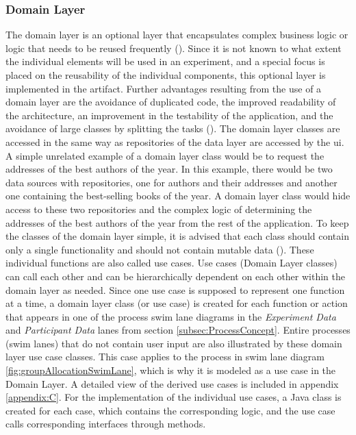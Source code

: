 \subsubsection{Domain Layer}

The domain layer is an optional layer that encapsulates complex business logic or logic that needs to be reused frequently (\cite{Google.2023}). Since it is not known to what extent the individual elements will be used in an experiment, and a special focus is placed on the reusability of the individual components, this optional layer is implemented in the artifact. Further advantages resulting from the use of a domain layer are the avoidance of duplicated code, the improved readability of the architecture, an improvement in the testability of the application, and the avoidance of large classes by splitting the tasks (\cite{Google.2023}). The domain layer classes are accessed in the same way as repositories of the data layer are accessed by the \ac{ui}. A simple unrelated example of a domain layer class would be to request the addresses of the best authors of the year. In this example, there would be two data sources with repositories, one for authors and their addresses and another one containing the best-selling books of the year. A domain layer class would hide access to these two repositories and the complex logic of determining the addresses of the best authors of the year from the rest of the application. To keep the classes of the domain layer simple, it is advised that each class should contain only a single functionality and should not contain mutable data (\cite{Google.2023}). These individual functions are also called use cases. Use cases (Domain Layer classes) can call each other and can be hierarchically dependent on each other within the domain layer as needed. Since one use case is supposed to represent one function at a time, a domain layer class (or use case) is created for each function or action that appears in one of the process swim lane diagrams in the \textit{Experiment Data} and \textit{Participant Data} lanes from section \ref{subsec:ProcessConcept}. Entire processes (swim lanes) that do not contain user input are also illustrated by these domain layer use case classes. This case applies to the process in swim lane diagram \ref{fig:groupAllocationSwimLane}, which is why it is modeled as a use case in the Domain Layer. A detailed view of the derived use cases is included in appendix \ref{appendix:C}. For the implementation of the individual use cases, a Java class is created for each case, which contains the corresponding logic, and the use case calls corresponding interfaces through methods.


